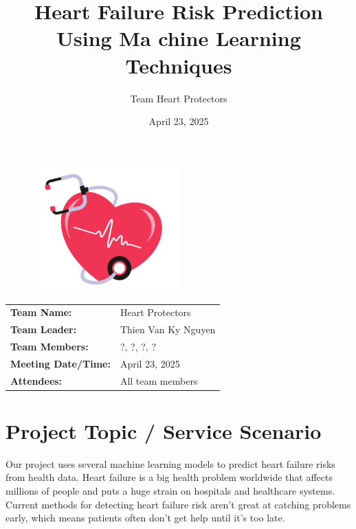 \documentclass[11pt,a4paper]{article}
\makeatletter
\renewcommand{\maketitle}{
  \begin{center}
    \vspace*{-0.25in} %
    {\LARGE \textbf{\@title}} \\[0.3cm]
    {\large \@subtitle} \\[0.2cm]
    {\normalsize \textit{\@author}} \\[0.1cm]
    {\normalsize \@date} \\
  \end{center}
  \vspace{0.3cm} %
}
\newcommand{\subtitle}[1]{\def\@subtitle{#1}}
\def\@subtitle{}
\makeatother
\begin{document}
\begin{figure}[H]
    \centering
    \includegraphics[width=0.5\textwidth]{./pictures/cover.png}
\end{figure}




\title{Heart Failure Risk Prediction Using Ma chine Learning Techniques}
\subtitle{Team Meeting Report – Final Report}
\author{Team Heart Protectors}
\date{April 23, 2025}


\begin{tabular}{ll}
    \textbf{Team Name:}         & Heart Protectors    \\
    \textbf{Team Leader:}       & Thien Van Ky Nguyen \\
    \textbf{Team Members:}      & ?, ?, ?, ?          \\
    \textbf{Meeting Date/Time:} & April 23, 2025      \\
    \textbf{Attendees:}         & All team members
\end{tabular}

\section{Project Topic / Service Scenario}

Our project uses several machine learning models to predict heart failure
risks from health data.
Heart failure is a big health problem worldwide that affects
millions of people and puts a huge strain on hospitals and
healthcare systems.
Current methods for detecting heart failure risk
aren't great at catching problems early,
which means patients often don't get help until it's too late.
\end{document}
